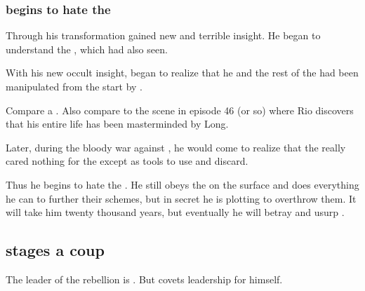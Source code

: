 \subsubsection{\Azraid begins to hate the \banes}
Through his transformation \Azraid gained new and terrible insight. 
He began to understand the , which \Sethicus had also seen. 


With his new occult insight, \Azraid began to realize that he and the rest of the \resphain had been manipulated from the start by \Daggerrain. 

Compare a . 
Also compare to the scene in \emph{\JuukenSentaiGekiranger} episode 46 (or so) where Rio discovers that his entire life has been masterminded by Long. 

Later, during the bloody war against \Merkyrah{}, he would come to realize that the \banes{} really cared nothing for the \resphain{} except as tools to use and discard. 

Thus he begins to hate the \banes. 
He still obeys the \banelords{} on the surface and does everything he can to further their schemes, but in secret he is plotting to overthrow them. 
It will take him twenty thousand years, but eventually he will betray and usurp \Banelord{} \Daggerrain. 









\subsection{\Morcariel stages a coup}
The leader of the rebellion is \Damiarch. 
But \Morcariel covets leadership for himself. 





